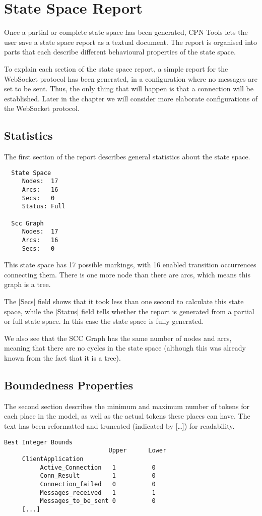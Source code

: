 \section{State Space Report}
Once a partial or complete state space has been generated, CPN Tools lets the
user save a state space report as a textual document. The report is organised
into parts that each describe different behavioural properties of the state
space.

To explain each section of the state space report, a simple report for the
WebSocket protocol has been generated, in a configuration where no messages are
set to be sent. Thus, the only thing that will happen is that a connection will
be established. Later in the chapter we will consider more elaborate
configurations of the WebSocket protocol.
	
	\subsection{Statistics}
	The first section of the report describes general statistics about the state
	space.
	\begin{lstlisting}
  State Space
     Nodes:  17
     Arcs:   16
     Secs:   0
     Status: Full

  Scc Graph
     Nodes:  17
     Arcs:   16
     Secs:   0

	\end{lstlisting}
	This state space has 17 possible markings, with 16 enabled transition
	occurrences connecting them. There is one more node than there are arcs, which
	means this graph is a tree.
	
	The |Secs| field shows that it took less than one second to calculate this
	state space, while the |Status| field tells whether the report is generated
	from a partial or full state space. In this case the state space is fully
	generated.
	
	We also see that the SCC Graph has the same number of nodes and arcs, meaning
	that there are no cycles in the state space (although this was already known
	from the fact that it is a tree).
	
	\subsection{Boundedness Properties}
	The second section describes the minimum and maximum number of tokens for
	each place in the model, as well as the actual tokens these places can have.
	The text has been reformatted and truncated (indicated by [\ldots]) for
	readability.
	\begin{lstlisting}[language={}]
    Best Integer Bounds
                             Upper      Lower
     ClientApplication
          Active_Connection   1          0
          Conn_Result         1          0
          Connection_failed   0          0
          Messages_received   1          1
          Messages_to_be_sent 0          0
     [...]
	\end{lstlisting}
	
